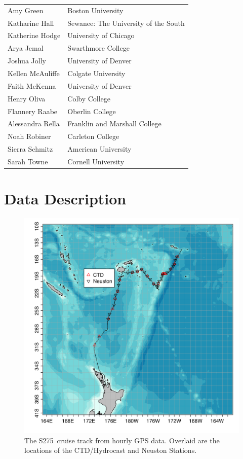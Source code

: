 \documentclass[letterpaper,11pt]{article}
\newcommand{\cruiseID}{S275}
\begin{document}
\begin{table}[ht]
\begin{tabular}{p{8cm} l}
  Amy Green&	Boston University\\
  Katharine Hall &	Sewanee: The University of the South\\
  Katherine Hodge &	University of Chicago\\
  Arya Jemal &	Swarthmore College \\
  Joshua Jolly &	University of Denver\\
  Kellen McAuliffe&	Colgate University\\
  Faith McKenna&	University of Denver\\
  Henry Oliva&	Colby College \\
  Flannery Raabe&	Oberlin College\\
  Alessandra Rella&	Franklin and Marshall College \\
  Noah Robiner&	Carleton College\\
  Sierra Schmitz&	American University\\
  Sarah Towne&	Cornell University\\

\end{tabular}
\end{table}

\clearpage
\section*{Data Description}

\begin{figure}
\includegraphics[width=\linewidth]{./plots/S275_cruiseTrack.png}
\caption[The \cruiseID\ cruise track]{The \cruiseID\ cruise track from hourly GPS data. Overlaid are the locations of the CTD/Hydrocast and Neuston Stations.}
\label{cruiseTrack}
\end{figure}
\end{document}
